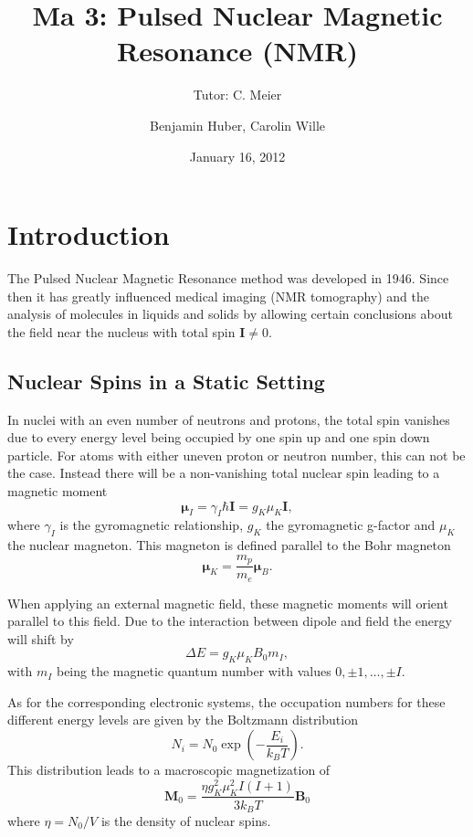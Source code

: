 \documentclass[a4paper]{scrartcl}
\title{Ma 3: Pulsed Nuclear Magnetic Resonance (NMR)}
\subtitle{Tutor: C. Meier}
\author{Benjamin Huber, Carolin Wille}
\date{January 16, 2012}
\numberwithin{equation}{section}
\numberwithin{figure}{section}
\numberwithin{table}{section}
\newcommand{\eq}[2]{\begin{equation}#1\label{#2}\end{equation}}
\newcommand{\ve}[1]{\mathbf{ #1} }
\begin{document}
\thispagestyle{empty}
\maketitle
\tableofcontents
\clearpage


\section{Introduction}
The Pulsed Nuclear Magnetic Resonance method was developed in 1946. Since then it has greatly influenced medical imaging (NMR tomography) and the analysis of molecules in liquids and solids by allowing certain conclusions about the field near the nucleus with total spin $\ve I \neq 0$.


\subsection{Nuclear Spins in a Static Setting}
In nuclei with an even number of neutrons and protons, the total spin vanishes due to every energy level being occupied by one spin up and one spin down particle. For atoms with either uneven proton or neutron number, this can not be the case. Instead there will be a non-vanishing total nuclear spin leading to a magnetic moment
\eq{\ve \mu_I = \gamma_I \hbar \ve I =g_K \mu_K \ve I,}{}
where $\gamma_I$ is the gyromagnetic relationship, $g_K$ the gyromagnetic g-factor and $\mu_K$ the nuclear magneton. This magneton is defined parallel to the Bohr magneton
\eq{\ve \mu_K = \frac{m_p}{m_e}\ve \mu_B .}{}

When applying an external magnetic field, these magnetic moments will orient parallel to this field. Due to the interaction between dipole and field the energy will shift by
\eq{\Delta E = g_K\mu_K B_0 m_I ,}{}
with $m_I$ being the magnetic quantum number with values $0,\pm 1,\dots,\pm I$.

As for the corresponding electronic systems, the occupation numbers for these different energy levels are given by the Boltzmann distribution
\eq{N_i = N_0 \exp\left( -\frac{E_i}{k_B T} \right) .}{}
This distribution leads to a macroscopic magnetization of
\eq{\ve M_0 = \frac{\eta g_K^2 \mu_K^2 I(I+1)}{3 k_B T} \ve B_0}{}
where $\eta = N_0/V$ is the density of nuclear spins.
\end{document}
